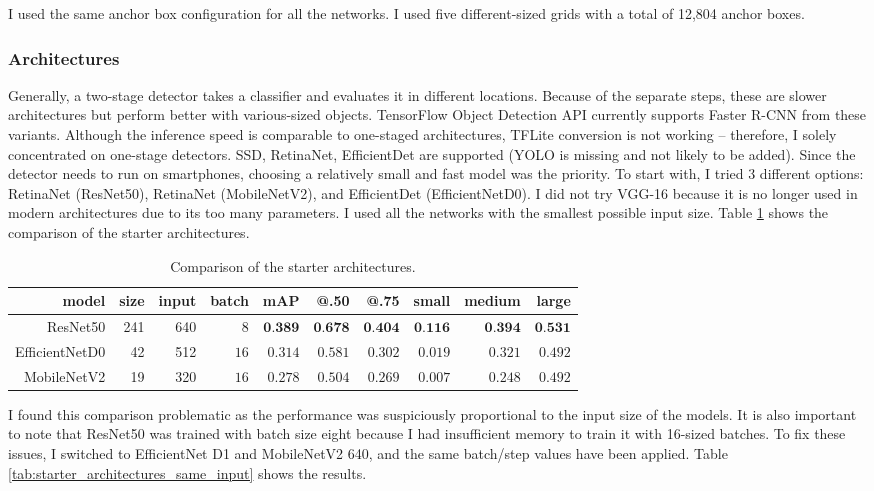 I used the same anchor box configuration for all the networks. I used five different-sized grids with a total of 12,804 anchor boxes.

\subsubsection{Architectures}

Generally, a two-stage detector takes a classifier and evaluates it in different locations. Because of the separate steps, these are slower architectures but perform better with various-sized objects. TensorFlow Object Detection API currently supports Faster R-CNN from these variants. Although the inference speed is comparable to one-staged architectures, TFLite conversion is not working – therefore, I solely concentrated on one-stage detectors. SSD, RetinaNet, EfficientDet are supported (YOLO is missing and not likely to be added). Since the detector needs to run on smartphones, choosing a relatively small and fast model was the priority. To start with, I tried 3 different options: RetinaNet (ResNet50), RetinaNet (MobileNetV2), and EfficientDet (EfficientNetD0). I did not try VGG-16 because it is no longer used in modern architectures due to its too many parameters. I used all the networks with the smallest possible input size. Table \ref{tab:starter_architectures} shows the comparison of the starter architectures.

\begin{table}[htb]
\caption{Comparison of the starter architectures.}
\label{tab:starter_architectures}
\noindent
\centering
\begin{tabular*}
{\columnwidth}{@{\extracolsep{\stretch{1}}}*{10}{r}@{}}
    model & size & input & batch & mAP & @.50 & @.75 & small & medium & large\\ \hline
    ResNet50 & 241 & 640 & $8$ & $\textbf{0.389}$ & $\textbf{0.678}$ & $\textbf{0.404}$ & $\textbf{0.116}$ & $\textbf{0.394}$ & $\textbf{0.531}$\\
    EfficientNetD0 & 42 & 512 & $16$ & $0.314$ & $0.581$ & $0.302$ & $0.019$ & $0.321$ & $0.492$\\
    MobileNetV2 & 19 & 320 & $16$ & $0.278$ & $0.504$ & $0.269$ & $0.007$ & $0.248$ & $0.492$\\
\end{tabular*}
\end{table}

I found this comparison problematic as the performance was suspiciously proportional to the input size of the models. It is also important to note that ResNet50 was trained with batch size eight because I had insufficient memory to train it with 16-sized batches. To fix these issues, I switched to EfficientNet D1 and MobileNetV2 640, and the same batch/step values have been applied. Table \ref{tab:starter_architectures_same_input} shows the results.

